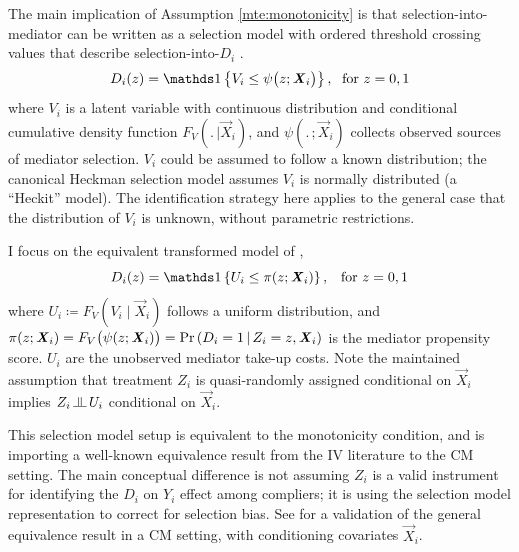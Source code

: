 The main implication of Assumption \ref{mte:monotonicity} is that selection-into-mediator can be written as a selection model with ordered threshold crossing values that describe selection-into-$D_i$ \citep{vytlacil2002independence}.
\[ D_i(z) = \indicator{V_i \leq \psi \big( z; \vec X_i \big)},
    \;\text{ for } z=0,1 \]
where $V_i$ is a latent variable with continuous distribution and conditional cumulative density function $F_V(. \,|\vec X_i)$, and $\psi(. \,;\vec X_i)$ collects observed sources of mediator selection.
$V_i$ could be assumed to follow a known distribution; the canonical Heckman selection model assumes $V_i$ is normally distributed (a ``Heckit'' model).
The identification strategy here applies to the general case that the distribution of $V_i$ is unknown, without parametric restrictions.

I focus on the equivalent transformed model of \cite{heckman2005structural},
\[ D_i(z) = \indicator{U_i \leq \pi(z; \vec X_i)},
    \;\;\; \text{for } z=0,1 \]
where $U_i \coloneqq F_V\left( V_i \mid \vec X_i \right)$
follows a uniform distribution, and $\pi(z; \boldsymbol{\mathit{X}}_i) = F_V\big(\psi(z; \boldsymbol{\mathit{X}}_i)\big) = \Pr\left( D_i = 1 \, \middle\vert \, Z_i = z, \boldsymbol{\mathit{X}}_i \right)$ is the mediator propensity score.
$U_i$ are the unobserved mediator take-up costs.
Note the maintained assumption that treatment $Z_i$ is quasi-randomly assigned conditional on $\vec X_i$ implies $Z_i \indep U_i$ conditional on $\vec X_i$.

This selection model setup is equivalent to the monotonicity condition, and is importing a well-known equivalence result from the IV literature to the CM setting.
The main conceptual difference is not assuming $Z_i$ is a valid instrument for identifying the $D_i$ on $Y_i$ effect among compliers; it is using the selection model representation to correct for selection bias.
See  for a validation of the general \cite{vytlacil2002independence} equivalence result in a CM setting, with conditioning covariates $\vec X_i$.

